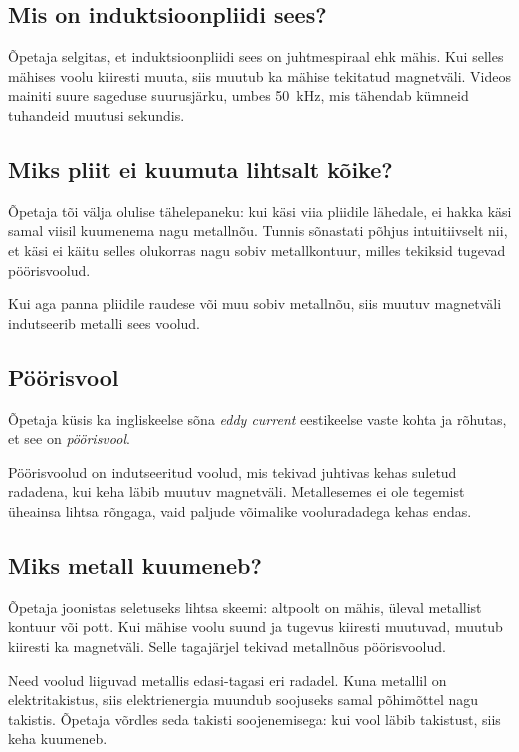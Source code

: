 \documentclass[a4paper,11pt]{article}
\begin{document}
\subsection{Mis on induktsioonpliidi sees?}

Õpetaja selgitas, et induktsioonpliidi sees on juhtmespiraal ehk mähis. Kui selles mähises voolu kiiresti muuta, siis muutub ka mähise tekitatud magnetväli. Videos mainiti suure sageduse suurusjärku, umbes \SI{50}{\kilo\hertz}, mis tähendab kümneid tuhandeid muutusi sekundis.

\subsection{Miks pliit ei kuumuta lihtsalt kõike?}

Õpetaja tõi välja olulise tähelepaneku: kui käsi viia pliidile lähedale, ei hakka käsi samal viisil kuumenema nagu metallnõu. Tunnis sõnastati põhjus intuitiivselt nii, et käsi ei käitu selles olukorras nagu sobiv metallkontuur, milles tekiksid tugevad pöörisvoolud.

Kui aga panna pliidile raudese või muu sobiv metallnõu, siis muutuv magnetväli indutseerib metalli sees voolud.

\subsection{Pöörisvool}

Õpetaja küsis ka ingliskeelse sõna \emph{eddy current} eestikeelse vaste kohta ja rõhutas, et see on \emph{pöörisvool}.

Pöörisvoolud on indutseeritud voolud, mis tekivad juhtivas kehas suletud radadena, kui keha läbib muutuv magnetväli. Metallesemes ei ole tegemist üheainsa lihtsa rõngaga, vaid paljude võimalike vooluradadega kehas endas.

\subsection{Miks metall kuumeneb?}

Õpetaja joonistas seletuseks lihtsa skeemi: altpoolt on mähis, üleval metallist kontuur või pott. Kui mähise voolu suund ja tugevus kiiresti muutuvad, muutub kiiresti ka magnetväli. Selle tagajärjel tekivad metallnõus pöörisvoolud.

Need voolud liiguvad metallis edasi-tagasi eri radadel. Kuna metallil on elektritakistus, siis elektrienergia muundub soojuseks samal põhimõttel nagu takistis. Õpetaja võrdles seda takisti soojenemisega: kui vool läbib takistust, siis keha kuumeneb.
\end{document}
